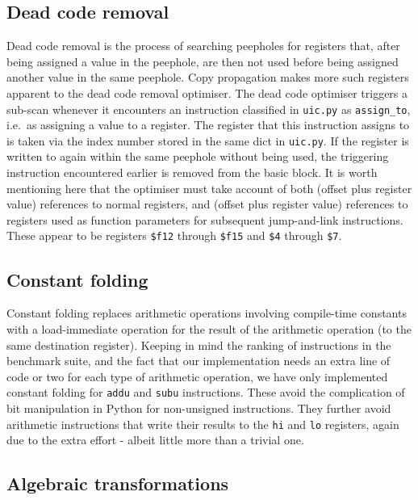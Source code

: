 \subsection{Dead code removal}
\label{sub:deadcode}

Dead code removal is the process of searching peepholes for registers that,
after being assigned a value in the peephole, are then not used before being
assigned another value in the same peephole. Copy propagation makes more such
registers apparent to the dead code removal optimiser. The dead code optimiser
triggers a sub-scan whenever it encounters an instruction classified in
\texttt{uic.py} as \texttt{assign\_to}, i.e.\ as assigning a value to a
register. The register that this instruction assigns to is taken via the index
number stored in the same dict in \texttt{uic.py}. If the register is written to
again within the same peephole without being used, the triggering instruction
encountered earlier is removed from the basic block. It is worth mentioning here
that the optimiser must take account of both (offset plus register value)
references to normal registers, and (offset plus register value) references to
registers used as function parameters for subsequent jump-and-link instructions.
These appear to be registers \texttt{\$f12} through \texttt{\$f15} and
\texttt{\$4} through \texttt{\$7}.


\subsection{Constant folding}
\label{sub:constfold}

Constant folding replaces arithmetic operations involving compile-time constants
with a load-immediate operation for the result of the arithmetic operation (to
the same destination register). Keeping in mind the ranking of instructions in
the benchmark suite, and the fact that our implementation needs an extra line of
code or two for each type of arithmetic operation, we have only implemented
constant folding for \texttt{addu} and \texttt{subu} instructions. These avoid
the complication of bit manipulation in Python for non-unsigned instructions.
They further avoid arithmetic instructions that write their results to the
\texttt{hi} and \texttt{lo} registers, again due to the extra effort - albeit
little more than a trivial one.


\subsection{Algebraic transformations}
\label{sub:algebratrans}

